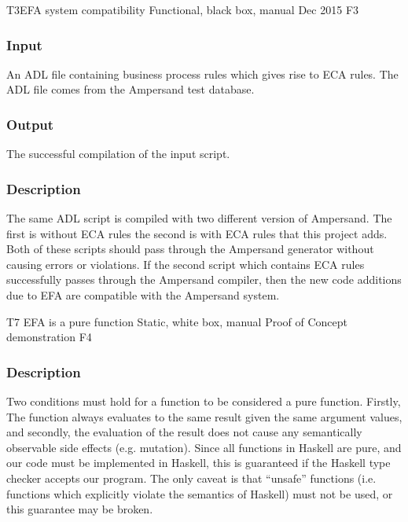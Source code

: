 \documentclass[12pt]{report}
\begin{document}
\systemTest
{T3}{EFA system compatibility}
{Functional, black box, manual}
{Dec 2015}
{F3}
\vspace{-12pt}\subsubsection*{Input}
An ADL file containing business process rules which gives rise to ECA rules. 
The ADL file comes from the Ampersand test database. 

\vspace{-12pt}\subsubsection*{Output}
The successful compilation of the input script.
	
\vspace{-12pt}\subsubsection*{Description}
The same ADL script is compiled with two different version of Ampersand.  The
first is without ECA rules the second is with ECA rules that this project
adds. Both of these scripts should pass through the Ampersand generator without
causing errors or violations. If the second script which contains ECA rules
successfully passes through the Ampersand compiler, then the new code additions
due to EFA are compatible with the Ampersand system.

\systemTest
{T7}
{EFA is a pure function}
{Static, white box, manual}
{Proof of Concept demonstration}
{F4}
\vspace{-12pt}\subsubsection*{Description} 

Two conditions must hold for a function to be considered a pure
function. Firstly, The function always evaluates to the same result given the
same argument values, and secondly, the evaluation of the result does not cause
any semantically observable side effects (e.g. mutation). Since all functions in
Haskell are pure, and our code must be implemented in Haskell, this is
guaranteed if the Haskell type checker accepts our program. The only caveat is
that ``unsafe'' functions (i.e. functions which explicitly violate the semantics
of Haskell) must not be used, or this guarantee may be broken.
\end{document}
